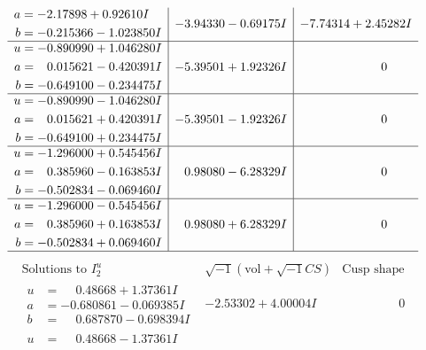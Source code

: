 \documentclass[1p]{elsarticle_modified}
\theoremstyle{definition}
\newcommand{\I}{\sqrt{-1}}
\begin{document}
$$\begin{array}{c|c|c}
\begin{aligned}
a &= -2.17898 + 0.92610 I \\
b &= -0.215366 - 1.023850 I\end{aligned}
 & -3.94330 - 0.69175 I & -7.74314 + 2.45282 I \\ \hline\begin{aligned}
u &= -0.890990 + 1.046280 I \\
a &= \phantom{-}0.015621 - 0.420391 I \\
b &= -0.649100 - 0.234475 I\end{aligned}
 & -5.39501 + 1.92326 I & \phantom{-0.000000 } 0 \\ \hline\begin{aligned}
u &= -0.890990 - 1.046280 I \\
a &= \phantom{-}0.015621 + 0.420391 I \\
b &= -0.649100 + 0.234475 I\end{aligned}
 & -5.39501 - 1.92326 I & \phantom{-0.000000 } 0 \\ \hline\begin{aligned}
u &= -1.296000 + 0.545456 I \\
a &= \phantom{-}0.385960 - 0.163853 I \\
b &= -0.502834 - 0.069460 I\end{aligned}
 & \phantom{-}0.98080 - 6.28329 I & \phantom{-0.000000 } 0 \\ \hline\begin{aligned}
u &= -1.296000 - 0.545456 I \\
a &= \phantom{-}0.385960 + 0.163853 I \\
b &= -0.502834 + 0.069460 I\end{aligned}
 & \phantom{-}0.98080 + 6.28329 I & \phantom{-0.000000 } 0\\
 \hline 
 \end{array}$$\newpage$$\begin{array}{c|c|c}  
\text{Solutions to }I^u_{2}& \I (\text{vol} + \sqrt{-1}CS) & \text{Cusp shape}\\
 \hline 
\begin{aligned}
u &= \phantom{-}0.48668 + 1.37361 I \\
a &= -0.680861 - 0.069385 I \\
b &= \phantom{-}0.687870 - 0.698394 I\end{aligned}
 & -2.53302 + 4.00004 I & \phantom{-0.000000 } 0 \\ \hline\begin{aligned}
u &= \phantom{-}0.48668 - 1.37361 I \\

\end{aligned}
\end{array}$$
\end{document}
